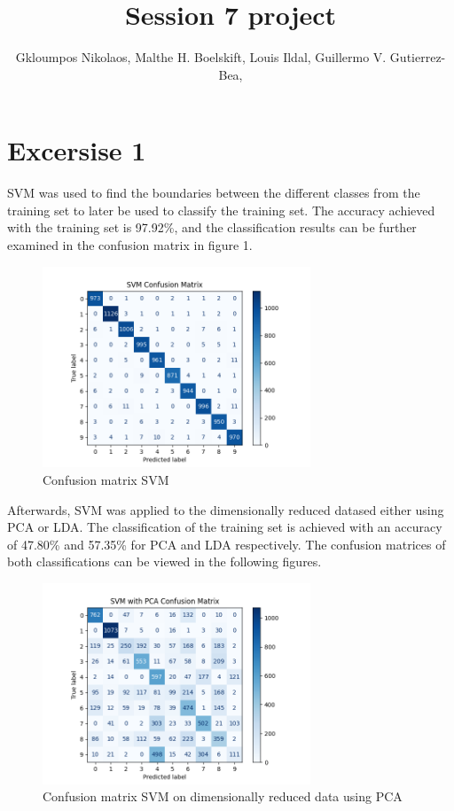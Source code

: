 \documentclass{article}
\title{Session 7 project}
\author {
      Gkloumpos Nikolaos,
      Malthe H. Boelskift,
      Louis Ildal,
      Guillermo V. Gutierrez-Bea,
}
\begin{document}
\maketitle


\section{Excersise 1}

SVM was used to find the boundaries between the different classes from the training set to later be used to classify the training set. The accuracy achieved with the training set is 97.92\%, and the classification results can be further examined in the confusion matrix in figure 1.
\begin{figure}[H]
      \includegraphics[width=8cm]{assets/figure1.png}
      \centering
      \caption{Confusion matrix SVM}
\end{figure}


Afterwards, SVM was applied to the dimensionally reduced datased either using PCA or LDA. The classification of the training 
set is achieved with an accuracy of 47.80\% and 57.35\% for PCA and LDA respectively. The confusion matrices of both classifications can be viewed in the following figures.
\begin{figure}[H]
      \includegraphics[width=8cm]{assets/firugre2.png}
      \centering
      \caption{Confusion matrix SVM on dimensionally reduced data using PCA} %
\end{figure}
\end{document}
